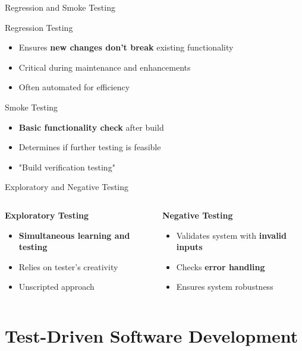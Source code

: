 \documentclass{beamer}
\begin{document}
\begin{frame}[t]{Regression and Smoke Testing}
\begin{block}{Regression Testing}
\begin{itemize}
\item Ensures \textbf{new changes don't break} existing functionality
\item Critical during maintenance and enhancements
\item Often automated for efficiency
\end{itemize}
\end{block}

\begin{block}{Smoke Testing}
\begin{itemize}
\item \textbf{Basic functionality check} after build
\item Determines if further testing is feasible
\item "Build verification testing"
\end{itemize}
\end{block}
\end{frame}

\begin{frame}[t]{Exploratory and Negative Testing}
\begin{columns}[T]
\begin{column}{0.48\textwidth}
\textbf{Exploratory Testing}
\begin{itemize}
\item \textbf{Simultaneous learning and testing}
\item Relies on tester's creativity
\item Unscripted approach
\end{itemize}
\end{column}
\begin{column}{0.48\textwidth}
\textbf{Negative Testing}
\begin{itemize}
\item Validates system with \textbf{invalid inputs}
\item Checks \textbf{error handling}
\item Ensures system robustness
\end{itemize}
\end{column}
\end{columns}
\end{frame}

\section{Test-Driven Software Development}
\end{document}
